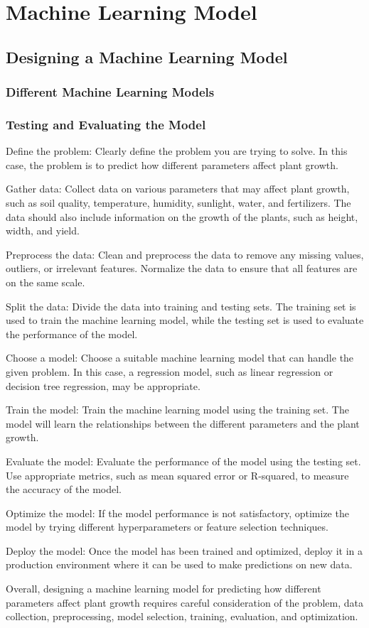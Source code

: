 \chapter{Machine Learning Model}

\section{Designing a Machine Learning Model}

\subsection{Different Machine Learning Models}

\subsection{Testing and Evaluating the Model}

Define the problem: Clearly define the problem you are trying to solve. In this case, the problem is to predict how different parameters affect plant growth.

Gather data: Collect data on various parameters that may affect plant growth, such as soil quality, temperature, humidity, sunlight, water, and fertilizers. The data should also include information on the growth of the plants, such as height, width, and yield.

Preprocess the data: Clean and preprocess the data to remove any missing values, outliers, or irrelevant features. Normalize the data to ensure that all features are on the same scale.

Split the data: Divide the data into training and testing sets. The training set is used to train the machine learning model, while the testing set is used to evaluate the performance of the model.

Choose a model: Choose a suitable machine learning model that can handle the given problem. In this case, a regression model, such as linear regression or decision tree regression, may be appropriate.

Train the model: Train the machine learning model using the training set. The model will learn the relationships between the different parameters and the plant growth.

Evaluate the model: Evaluate the performance of the model using the testing set. Use appropriate metrics, such as mean squared error or R-squared, to measure the accuracy of the model.

Optimize the model: If the model performance is not satisfactory, optimize the model by trying different hyperparameters or feature selection techniques.

Deploy the model: Once the model has been trained and optimized, deploy it in a production environment where it can be used to make predictions on new data.

Overall, designing a machine learning model for predicting how different parameters affect plant growth requires careful consideration of the problem, data collection, preprocessing, model selection, training, evaluation, and optimization.